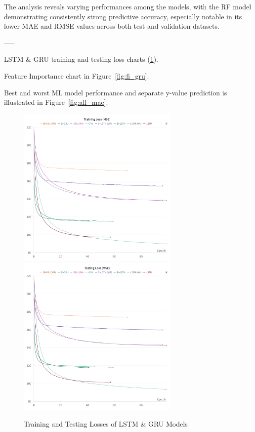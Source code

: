 The analysis reveals varying performances among the models, with the RF model demonstrating consistently strong predictive accuracy, especially notable in its lower MAE and RMSE values across both test and validation datasets.

-----

LSTM \& GRU training and testing loss charts (\ref{fig:train_test_mse}).

Feature Importance chart in Figure~\ref{fig:fi_gru}.

Best and worst ML model performance and separate y-value prediction is illustrated in Figure~\ref{fig:all_mae}.

\begin{figure}[p]
    \centering
    \begin{minipage}{\textwidth}
        \centering
        \includegraphics[width=0.7\textwidth]{images/results/training_loss_mse}
        \vspace{0.001cm}
        \includegraphics[width=0.7\textwidth]{images/results/testing_loss_mse}
        \captionsetup{format=plain, justification=centering, font=small}
        \caption{Training and Testing Losses of LSTM \& GRU Models}
        \label{fig:train_test_mse}
    \end{minipage}
\end{figure}

